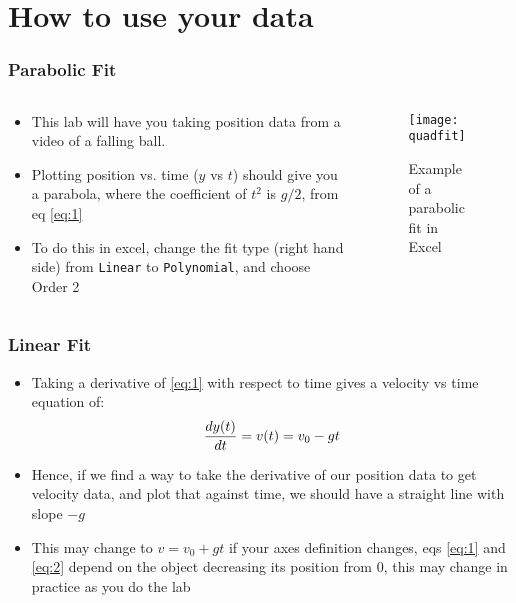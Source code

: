 \documentclass[aspectratio=169]{beamer}
\begin{document}
\section{How to use your data}
\begin{frame}
  \frametitle{Parabolic Fit}
  \begin{columns}
    \begin{column}{0.5\textwidth}
      \begin{itemize}
      \item This lab will have you taking position data from a video of a falling ball.
      \item Plotting position vs. time ($y$ vs $t$) should give you a parabola, where the coefficient of $t^2$ is $g/2$, from eq \eqref{eq:1}
      \item To do this in excel, change the fit type (right hand side) from \texttt{Linear} to \texttt{Polynomial}, and choose Order 2
      \end{itemize}
    \end{column}
    \begin{column}{0.5\textwidth}
      \begin{figure}[H]
        \centering
        \texttt{[image: quadfit]}
        \caption{Example of a parabolic fit in Excel}
      \end{figure}
    \end{column}
  \end{columns}
\end{frame}

\begin{frame}
  \frametitle{Linear Fit}
  \begin{itemize}
  \item Taking a derivative of \eqref{eq:1} with respect to time gives a velocity vs time equation of:
    \begin{equation}
      \label{eq:2}
      \dv{y(t)}{t}=v(t)=v_0-gt
    \end{equation}
  \item Hence, if we find a way to take the derivative of our position data to get velocity data, and plot that against time, we should have a straight line with slope $-g$
  \item This may change to $v=v_0+gt$ if your axes definition changes, eqs \eqref{eq:1} and \eqref{eq:2} depend on the object decreasing its position from $0$, this may change in practice as you do the lab
  \end{itemize}
\end{frame}
\end{document}
